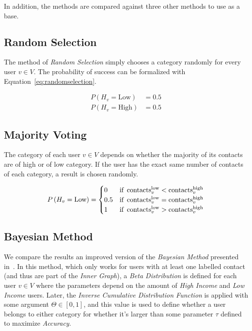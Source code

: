 In addition, the methods are compared against three other methods to use as a base.



\subsection{Random Selection}

The method of \emph{Random Selection} simply chooses a category randomly for every user $v \in V$. The probability of success can be formalized with Equation~\ref{eq:randomselection}.

\begin{equation}
\label{eq:randomselection}
\begin{aligned}
	P \left( H_v = \text{Low} \right) &= 0.5 \\
	P \left( H_v = \text{High} \right) &= 0.5
\end{aligned}
\end{equation}

\subsection{Majority Voting}

The category of each user $v \in V$ depends on whether the majority of its contacts are of high or of low category. If the user has the exact same number of contacts of each category, a result is chosen randomly.

\begin{equation}
\label{eq:majorityvoting}
	P \left( H_v = \text{Low} \right) =
	\begin{cases}
		0 & \text{if} \ \operatorname{contacts}^{\operatorname{low}}_v < \operatorname{contacts}^{\operatorname{high}}_v \\
		0.5 & \text{if} \ \operatorname{contacts}^{\operatorname{low}}_v = \operatorname{contacts}^{\operatorname{high}}_v \\
		1 & \text{if} \ \operatorname{contacts}^{\operatorname{low}}_v > \operatorname{contacts}^{\operatorname{high}}_v
	\end{cases}
\end{equation}

\subsection{Bayesian Method}

We compare the results an improved version of the \emph{Bayesian Method} presented in~\cite{fixmanasonam2016}. In this method, which only works for users with at least one labelled contact (and thus are part of the \emph{Inner Graph}), a \emph{Beta Distribution} is defined for each user $v \in V$ where the parameters depend on the amount of \emph{High Income} and \emph{Low Income} users. Later, the \emph{Inverse Cumulative Distribution Function} is applied with some argument $\Theta \in \left[ 0, 1 \right]$, and this value is used to define whether a user belongs to either category for whether it's larger than some parameter $\tau$ defined to maximize \emph{Accuracy}.

